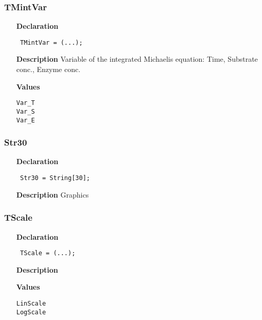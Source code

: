 \documentclass[12pt,a4paper,oneside]{report}
\newcommand{\declarationitem}[1]{\textbf{#1}}
\newcommand{\descriptiontitle}[1]{\textbf{#1}}
\newcommand{\code}[1]{\texttt{#1}}
\begin{document}
\subsubsection{TMintVar}
\label{utypes-TMintVar}
\begin{itemize}\item[\declarationitem{Declaration}\hfill]
	\begin{flushleft}
		\code{
			TMintVar = (...);}
		
	\end{flushleft}
	
	\par
	\item[\descriptiontitle{Description}]
	Variable of the integrated Michaelis equation: Time, Substrate conc., Enzyme conc.\item[\textbf{Values}]
	\begin{description}
		\item[\texttt{Var{\_}T}]  
		\item[\texttt{Var{\_}S}]  
		\item[\texttt{Var{\_}E}]  
	\end{description}
\end{itemize}
\subsubsection{Str30}
\label{utypes-Str30}
\begin{itemize}\item[\declarationitem{Declaration}\hfill]
	\begin{flushleft}
		\code{
			Str30  = String[30];}
	\end{flushleft}
	\item[\descriptiontitle{Description}]
	 Graphics	
\end{itemize}
\subsubsection{TScale}
\label{utypes-TScale}
\begin{itemize}\item[\declarationitem{Declaration}\hfill]
	\begin{flushleft}
		\code{
			TScale = (...);}
	\end{flushleft}
	\item[\descriptiontitle{Description}]
	\item[\textbf{Values}]
	\begin{description}
		\item[\texttt{LinScale}]  
		\item[\texttt{LogScale}]  
	\end{description}
\end{itemize}
\end{document}
